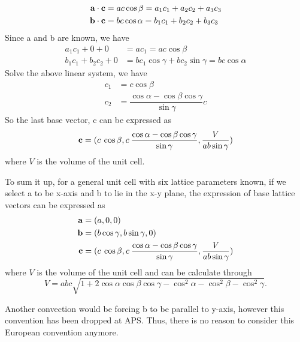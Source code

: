 \documentclass[12pt]{scrartcl}
\begin{document}
\begin{align*}
	\mathbf{a} \cdot \mathbf{c} &= ac\cos\beta   = a_1c_1 + a_2c_2 + a_3c_3 \\
	\mathbf{b} \cdot \mathbf{c} &= bc\cos\alpha = b_1c_1 + b_2c_2 + b_3c_3
\end{align*}
Since \vctr a and \vctr b are known, we have
\begin{align*}
	a_1c_1 + 0 + 0 &= ac_1 = ac\cos\beta \\
	b_1c_1 + b_2c_2 + 0 &= bc_1\cos\gamma  + bc_2\sin\gamma  = bc\cos\alpha
\end{align*}
Solve the above linear system, we have
\begin{align*}
	c_1 &= c\cos\beta \\
	c_2 &= \dfrac{\cos\alpha - \cos\beta\cos\gamma}{\sin\gamma}c
\end{align*}
So the last base vector, \vctr c can be expressed as
\[
	\mathbf{c} = ( c \: \cos\beta,
	                c \: \dfrac{\cos\alpha - \cos\beta\cos\gamma}{\sin\gamma},
	                \dfrac{V}{ab\sin\gamma})
\]
where $V$ is the volume of the unit cell.

To sum it up, for a general unit cell with six lattice parameters known, if we select \vctr a to be x-axis and \vctr b to lie in the x-y plane, the expression of base lattice vectors can be expressed as
\begin{align*}
	\mathbf{a} &= (a, 0, 0) \\
	\mathbf{b} &= (b\cos\gamma, b\sin\gamma, 0) \\
	\mathbf{c} &= ( c \: \cos\beta,
	                c \: \dfrac{\cos\alpha - \cos\beta\cos\gamma}{\sin\gamma},
	                \dfrac{V}{ab\sin\gamma})
\end{align*}
where $V$ is the volume of the unit cell and can be calculate through
\[
	V = abc\sqrt{1 + 2\cos\alpha\cos\beta\cos\gamma - \cos^2\alpha-\cos^2\beta-\cos^2\gamma}.
\]

Another convection would be forcing \vctr b to be parallel to y-axis, however this convention has been dropped at APS.
Thus, there is no reason to consider this European convention anymore.
\end{document}

